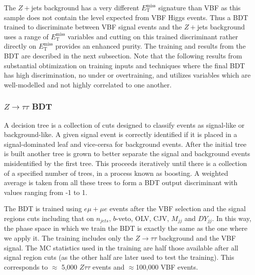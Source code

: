 The $Z+$jets background has a very different $E_{\text{T}}^{\text{miss}}$ signature than VBF as this sample does not contain the level expected from VBF Higgs events. Thus a BDT trained to discriminate between VBF signal events and the $Z+$jets background uses a range of $E_{\text{T}}^{\text{miss}}$ variables and cutting on this trained discriminant rather directly on $E_{\text{T}}^{\text{miss}}$ provides an enhanced purity. The training and results from the BDT are described in the next subsection. Note that the following results from substantial obtimization on training inputs and techniques where the final BDT has high discrimination, no under or overtraining, and utilizes variables which are well-modelled and not highly correlated to one another.  

\subsubsection{$Z\rightarrow\tau\tau$ BDT}
A decision tree is a collection of cuts designed to classify events as signal-like or background-like. A given signal event is correctly identified if it is placed in a signal-dominated leaf and vice-cersa for background events. After the initial tree is built another tree is grown to better separate the signal and background events misidentified by the first tree. This proceeds iteratively until there is a collection of a specified number of trees, in a process known as boosting. A weighted average is taken from all these trees to form a BDT output discriminant with values ranging from -1 to 1.

The BDT is trained using $e\mu+\mu e$ events after the VBF selection and the signal regions cuts including that on $n_{jets}$, $b$-veto, OLV, CJV, $M_{jj}$ and $DY_{jj}$. In this way, the phase space in which we train the BDT is exactly the same as the one where we apply it. The training includes only the $Z\rightarrow\tau\tau$ background and the VBF signal. The MC statistics used in the training are half those available after all signal region cuts (as the other half are later used to test the training). This corresponds to $\approx$ 5,000 $Z\tau\tau$ events and $\approx$100,000 VBF events.

